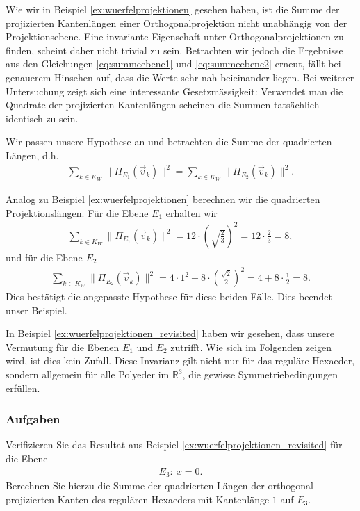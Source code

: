 Wie wir in Beispiel \ref{ex:wuerfelprojektionen} gesehen haben, ist die Summe der projizierten Kantenlängen einer Orthogonalprojektion nicht unabhängig von der Projektionsebene. Eine invariante Eigenschaft unter Orthogonalprojektionen zu finden, scheint daher nicht trivial zu sein. Betrachten wir jedoch die Ergebnisse aus den Gleichungen \eqref{eq:summeebene1} und \eqref{eq:summeebene2} erneut, fällt bei genauerem Hinsehen auf, dass die Werte sehr nah beieinander liegen. Bei weiterer Untersuchung zeigt sich eine interessante Gesetzmässigkeit: Verwendet man die Quadrate der projizierten Kantenlängen scheinen die Summen tatsächlich identisch zu sein.

\begin{example}  \label{ex:wuerfelprojektionen_revisited}
Wir passen unsere Hypothese an und betrachten die Summe der quadrierten Längen, d.h.
\begin{align}
    \sum_{k \in K_W} \|\Pi_{E_1}(\vec{v}_k)\|^2 = \sum_{k \in K_W} \|\Pi_{E_2}(\vec{v}_k)\|^2. \nonumber
\end{align}

Analog zu Beispiel \ref{ex:wuerfelprojektionen} berechnen wir die quadrierten Projektionslängen. Für die Ebene $E_1$ erhalten wir 
\begin{align}
    \sum_{k \in K_W} \|\Pi_{E_1}(\vec{v}_k)\|^2 = 12 \cdot \left(\sqrt{\frac{2}{3}}\right)^2 = 12 \cdot \frac{2}{3} = 8, \nonumber
\end{align}
und für die Ebene $E_2$
\begin{align}
    \sum_{k \in K_W} \|\Pi_{E_2}(\vec{v}_k)\|^2 = 4 \cdot 1^2 + 8 \cdot \left(\frac{\sqrt{2}}{2}\right)^2 = 4 + 8 \cdot \frac{1}{2} = 8. \nonumber
\end{align}
Dies bestätigt die angepasste Hypothese für diese beiden Fälle. Dies beendet unser Beispiel.
\end{example}

In Beispiel \ref{ex:wuerfelprojektionen_revisited} haben wir gesehen, dass unsere Vermutung für die Ebenen $E_1$ und $E_2$ zutrifft. Wie sich im Folgenden zeigen wird, ist dies kein Zufall. Diese Invarianz gilt nicht nur für das reguläre Hexaeder, sondern allgemein für alle Polyeder im $\mathbb{R}^3$, die gewisse Symmetriebedingungen erfüllen.

\subsubsection{Aufgaben}
\begin{exercise} \label{ex:verificationeinstiegesbeispielEbene3}
    Verifizieren Sie das Resultat aus Beispiel \ref{ex:wuerfelprojektionen_revisited} für die Ebene 
    \begin{align}
        E_3:\ x = 0. \nonumber
    \end{align}
    Berechnen Sie hierzu die Summe der quadrierten Längen der orthogonal projizierten Kanten des regulären Hexaeders mit Kantenlänge $1$ auf $E_3$.
\end{exercise}

